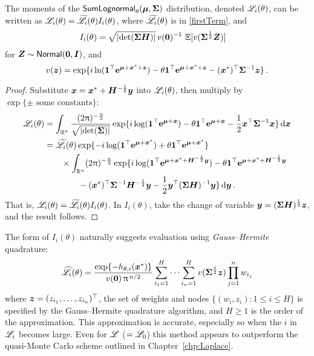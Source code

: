\begin{subappendices}
\begin{proposition} \label{prop:laplace_derivatives}
The moments of the $\mathsf{SumLognormal}_\theta(\bm{\mu}, \bm{\Sigma})$ distribution, denoted $\mathscr{L}_i(\theta)$, can be written as $\mathscr{L}_i(\theta) = \widetilde{\mathscr{L}}_i(\theta) I_i(\theta)$, where $\widetilde{\mathscr{L}}_i(\theta)$ is in \eqref{firstTerm}, and
\begin{align*}
	I_i(\theta) &= \sqrt{\lvert \det(\bm{\Sigma} \bm{H})\rvert} \, v(\bm{0})^{-1} \, \operatorname{{\mathbb E}}[v(\bm{\Sigma}^{\frac12} \bm{Z})]
\end{align*}
for $\bm{Z} \sim \mathsf{Normal}(\bm{0}, \bm{I})$, and
\[ v(\bm{z}) = \exp\{ i \ln(\bm{1}^\top \text{\bf{e}}^{\bm{\mu} + \bm{x}^* + \bm{z}}) - \theta \bm{1}^\top \text{\bf{e}}^{\bm{\mu} + \bm{x}^* + \bm{z}} - (\bm{x}^*)^\top \bm{\Sigma}^{-1} \bm{z} \} \,. \]
\end{proposition}
\begin{proof}
Substitute $\bm{x} = \bm{x}^* + \bm{H}^{-\frac12} \bm{y}$ into $\mathscr{L}_i(\theta)$, then multiply by $\exp\{ \pm \text{ some constants}\}$:
\begin{align*}
	\mathscr{L}_i(\theta) &= \int_{\mathbb{R}^n} \frac{ (2\uppi)^{-\frac{n}{2}} }{\sqrt{\lvert \det(\bm{\Sigma})\rvert}} \exp\{ i \log(\bm{1}^\top \text{\bf{e}}^{\bm{\mu} + \bm{x}}) - \theta \bm{1}^\top \text{\bf{e}}^{\bm{\mu} + \bm{x}} - \frac12 \bm{x}^\top \bm{\Sigma}^{-1} \bm{x} \}  \mathop{}\!\mathrm{d} \bm{x} \\
	&= \widetilde{\mathscr{L}}_i(\theta) \exp\{ -i \log(\bm{1}^\top \text{\bf{e}}^{\bm{\mu} + \bm{x}^*}) + \theta \bm{1}^\top \text{\bf{e}}^{\bm{\mu} + \bm{x}^*} \} \\
	&\qquad \times \int_{\mathbb{R}^n} (2\uppi)^{-\frac{n}{2}} \exp\{ i \log(\bm{1}^\top \text{\bf{e}}^{\bm{\mu} + \bm{x}^* + \bm{H}^{-\frac12} \bm{y}}) - \theta \bm{1}^\top \text{\bf{e}}^{\bm{\mu} + \bm{x}^* + \bm{H}^{-\frac12} \bm{y}} \\
	&\qquad\qquad -(\bm{x}^*)^\top \bm{\Sigma}^{-1} \bm{H}^{-\frac12} \bm{y} - \frac12 \bm{y}^\top (\bm{\Sigma} \bm{H})^{-1} \bm{y} \}  \mathop{}\!\mathrm{d} \bm{y} \,.
\end{align*}
That is, $\mathscr{L}_i(\theta) = \widetilde{\mathscr{L}}_i(\theta) I_i(\theta)$. In $I_i(\theta)$, take the change of variable $\bm{y} = (\bm{\Sigma}\bm{H})^{\frac12} \bm{z}$, and the result follows.
\end{proof}


\begin{remark}
The form of $I_i(\theta)$ naturally suggests evaluation using \emph{Gauss--Hermite} quadrature:
\begin{equation} \label{eq:gauss-hermite-quad}
	\widehat{\mathscr{L}}_i(\theta) = \frac{\exp\{-h_{\theta,i}(\bm{x}^*)\}}{v(\bm{0}) \,\uppi^{\,n/2}} \sum_{i_1=1}^H \cdots \sum_{i_n=1}^H v(\bm{\Sigma}^{\frac12} \bm{z})  \prod_{j=1}^n w_{i_j}
\end{equation}
where $\bm{z} = (z_{i_1}, \dots, z_{i_n})^\top$, the set of weights and nodes $\{(w_i, z_i) : 1 \le i \le H\}$ is specified by the Gauss--Hermite quadrature algorithm, and $H \ge 1$ is the order of the approximation. This approximation is accurate, especially so when the $i$ in $\mathscr{L}_i$ becomes large. Even for $\mathscr{L}$ ($= \mathscr{L}_0$) this method appears to outperform the quasi-Monte Carlo scheme outlined in Chapter~\ref{chp:Laplace}. \remQED
\end{remark}




\end{subappendices}
